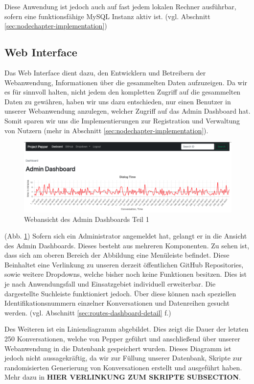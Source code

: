 Diese Anwendung ist jedoch auch auf fast jedem lokalen Rechner ausführbar, sofern eine funktionsfähige MySQL Instanz aktiv ist.
(vgl. Abschnitt \ref{sec:nodechapter-implementation})

\subsection{Web Interface}
\label{sec:nodechapter-web-interface}
Das Web Interface dient dazu, den Entwicklern und Betreibern der Webanwendung, Informationen über die gesammelten Daten
aufzuzeigen. Da wir es für sinnvoll halten, nicht jedem den kompletten Zugriff auf die gesammelten Daten zu gewähren, haben
wir uns dazu entschieden, nur einen Benutzer in unserer Webanwendung anzulegen, welcher Zugriff auf das Admin Dashboard hat.
Somit sparen wir uns die Implementierungen zur Registration und Verwaltung von Nutzern (mehr in Abschnitt \ref{sec:nodechapter-implementation}).\\


\begin{figure}[H]
    \includegraphics[width=\textwidth]{Figures/NodeChapter/adminDashboard1.png}
    \caption{Webansicht des Admin Dashboards Teil 1}
    \label{fig:admindashboard1}
    \centering
\end{figure}

(Abb. \ref{fig:admindashboard1}) Sofern sich ein Administrator angemeldet hat, gelangt er in die Ansicht des Admin Dashboards.
Dieses besteht aus mehreren Komponenten. Zu sehen ist, dass sich am oberen Bereich der Abbildung eine Menüleiste befindet.
Diese Beinhaltet eine Verlinkung zu unseren derzeit öffentlichen GitHub Repositories, sowie weitere Dropdowns, welche bisher noch
keine Funktionen besitzen. Dies ist je nach Anwendungsfall und Einsatzgebiet individuell erweiterbar.
Die dargestellte Suchleiste funktioniert jedoch. Über diese können nach speziellen Identifikationsnummern einzelner Konversationen
und Datenreihen gesucht werden. (vgl. Abschnitt \ref{sec:routes-dashboard-detail} f.)

Des Weiteren ist ein Liniendiagramm abgebildet. Dies zeigt die Dauer der letzten 250 Konversationen, welche von Pepper geführt
und anschließend über unserer Webanwendung in die Datenbank gespeichert wurden. Dieses Diagramm ist jedoch nicht aussagekräftig,
da wir zur Füllung unserer Datenbank, Skripte zur randomisierten Generierung von Konversationen erstellt und ausgeführt haben. Mehr dazu in
\textbf{HIER VERLINKUNG ZUM SKRIPTE SUBSECTION}.

